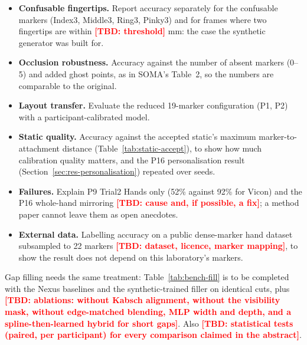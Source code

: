\documentclass[11pt,a4paper]{article}
\newcommand{\tbd}[1]{\textcolor{red}{\textbf{[TBD: #1]}}}
\begin{document}
\begin{itemize}[nosep]
  \item \textbf{Confusable fingertips.} Report accuracy separately for the confusable markers (Index3, Middle3, Ring3,
  Pinky3) and for frames where two fingertips are within \tbd{threshold} mm: the case the synthetic generator was built for.
  \item \textbf{Occlusion robustness.} Accuracy against the number of absent markers (0--5) and added ghost points, as in
  SOMA's Table~2, so the numbers are comparable to the original.
  \item \textbf{Layout transfer.} Evaluate the reduced 19-marker configuration (P1, P2) with a participant-calibrated model.
  \item \textbf{Static quality.} Accuracy against the accepted static's maximum marker-to-attachment distance
  (Table~\ref{tab:static-accept}), to show how much calibration quality matters, and the P16 personalisation result
  (Section~\ref{sec:res-personalisation}) repeated over seeds.
  \item \textbf{Failures.} Explain P9 Trial2 Hands only (52\% against 92\% for Vicon) and the P16 whole-hand mirroring
  \tbd{cause and, if possible, a fix}; a method paper cannot leave them as open anecdotes.
  \item \textbf{External data.} Labelling accuracy on a public dense-marker hand dataset subsampled to 22 markers
  \tbd{dataset, licence, marker mapping}, to show the result does not depend on this laboratory's markers.
\end{itemize}
Gap filling needs the same treatment: Table~\ref{tab:bench-fill} is to be completed with the Nexus baselines and the
synthetic-trained filler on identical cuts, plus \tbd{ablations: without Kabsch alignment, without the visibility
mask, without edge-matched blending, MLP width and depth, and a spline-then-learned hybrid for short gaps}. Also
\tbd{statistical tests (paired, per participant) for every comparison claimed in the abstract}.
\end{document}
